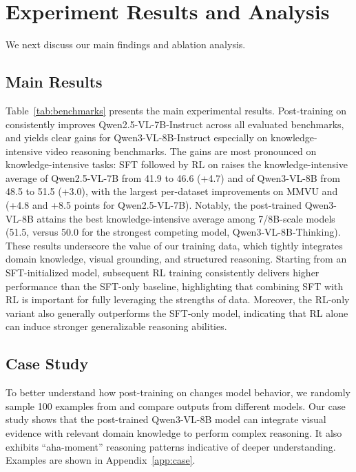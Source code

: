 \section{Experiment Results and Analysis}\label{sec:6}
We next discuss our main findings and ablation analysis.
\subsection{Main Results}
Table~\ref{tab:benchmarks} presents the main experimental results. 
Post-training on \data consistently improves Qwen2.5-VL-7B-Instruct across all evaluated benchmarks, and yields clear gains for Qwen3-VL-8B-Instruct especially on knowledge-intensive video reasoning benchmarks.
The gains are most pronounced on knowledge-intensive tasks: SFT followed by RL on \ours raises the knowledge-intensive average of Qwen2.5-VL-7B from 41.9 to 46.6 (+4.7) and of Qwen3-VL-8B from 48.5 to 51.5 (+3.0), with the largest per-dataset improvements on MMVU and \eval (\eg +4.8 and +8.5 points for Qwen2.5-VL-7B).
Notably, the post-trained Qwen3-VL-8B attains the best knowledge-intensive average among 7/8B-scale models (51.5, versus 50.0 for the strongest competing model, Qwen3-VL-8B-Thinking).
These results underscore the value of our training data, which tightly integrates domain knowledge, visual grounding, and structured reasoning.
Starting from an SFT-initialized model, subsequent RL training consistently delivers higher performance than the SFT-only baseline, highlighting that combining SFT with RL is important for fully leveraging the strengths of \ours data.
Moreover, the RL-only variant also generally outperforms the SFT-only model, indicating that RL alone can induce stronger generalizable reasoning abilities.

\subsection{Case Study}
To better understand how post-training on \ours changes model behavior, we randomly sample 100 examples from \eval and compare outputs from different models. Our case study shows that the post-trained Qwen3-VL-8B model can integrate visual evidence with relevant domain knowledge to perform complex reasoning. It also exhibits ``aha-moment'' reasoning patterns indicative of deeper understanding. Examples are shown in Appendix~\ref{app:case}.








